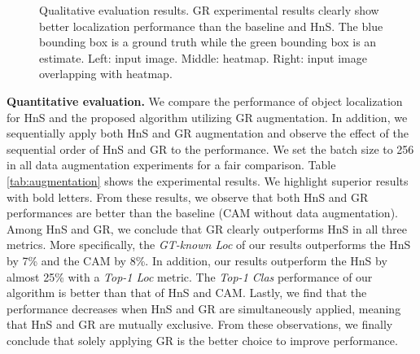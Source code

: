 \documentclass{bmvc2k}
\begin{document}
\begin{figure}[!t]
    \begin{center}
    \end{center}
    \caption{Qualitative evaluation results. GR experimental results clearly show better localization performance than the baseline and HnS. The blue bounding box is a ground truth while the green bounding box is an estimate. Left: input image. Middle: heatmap. Right: input image overlapping with heatmap.}
\label{fig:qualitative}
\end{figure}

\textbf{Quantitative evaluation.} We compare the performance of object localization for HnS and the proposed algorithm utilizing GR augmentation. In addition, we sequentially apply both HnS and GR augmentation and observe the effect of the sequential order of HnS and GR to the performance. We set the batch size to 256 in all data augmentation experiments for a fair comparison. Table \ref{tab:augmentation} shows the experimental results. We highlight superior results with bold letters. From these results, we observe that both HnS and GR performances are better than the baseline (CAM without data augmentation). Among HnS and GR, we conclude that GR clearly outperforms HnS in all three metrics. More specifically, the \textit{GT-known Loc} of our results outperforms the HnS by 7\% and the CAM by 8\%. In addition, our results outperform the HnS by almost 25\% with a \textit{Top-1 Loc} metric. The \textit{Top-1 Clas} performance of our algorithm is better than that of HnS and CAM. Lastly, we find that the performance decreases when HnS and GR are simultaneously applied, meaning that HnS and GR are mutually exclusive. From these observations, we finally conclude that solely applying GR is the better choice to improve performance.
\end{document}
